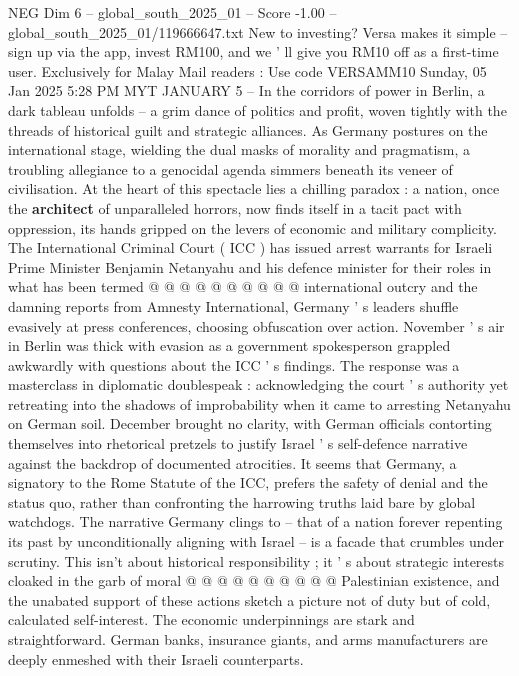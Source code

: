 \begin{textsample}{NEG Dim 6 – global\_south\_2025\_01 – Score -1.00 – global\_south\_2025\_01/119666647.txt}  \label{ex:f6_neg_086}
New to investing?
Versa makes it simple -- sign up via the app, invest RM100, and we ' ll give you RM10 off as a first-time user.
Exclusively for Malay Mail readers : Use code VERSAMM10 Sunday, 05 Jan 2025 5:28 PM MYT JANUARY 5 -- In the corridors of power in Berlin, a dark tableau unfolds -- a grim dance of politics and profit, woven tightly with the threads of historical guilt and strategic alliances.
As Germany postures on the international stage, wielding the dual masks of morality and pragmatism, a troubling allegiance to a genocidal agenda simmers beneath its veneer of civilisation.
At the heart of this spectacle lies a chilling paradox : a nation, once the \textbf{architect} of unparalleled horrors, now finds itself in a tacit pact with oppression, its hands gripped on the levers of economic and military complicity.
The International Criminal Court ( ICC ) has issued arrest warrants for Israeli Prime Minister Benjamin Netanyahu and his defence minister for their roles in what has been termed @ @ @ @ @ @ @ @ @ @ international outcry and the damning reports from Amnesty International, Germany ' s leaders shuffle evasively at press conferences, choosing obfuscation over action.
November ' s air in Berlin was thick with evasion as a government spokesperson grappled awkwardly with questions about the ICC ' s findings.
The response was a masterclass in diplomatic doublespeak : acknowledging the court ' s authority yet retreating into the shadows of improbability when it came to arresting Netanyahu on German soil.
December brought no clarity, with German officials contorting themselves into rhetorical pretzels to justify Israel ' s self-defence narrative against the backdrop of documented atrocities.
It seems that Germany, a signatory to the Rome Statute of the ICC, prefers the safety of denial and the status quo, rather than confronting the harrowing truths laid bare by global watchdogs.
The narrative Germany clings to -- that of a nation forever repenting its past by unconditionally aligning with Israel -- is a facade that crumbles under scrutiny.
This isn't about historical responsibility ; it ' s about strategic interests cloaked in the garb of moral @ @ @ @ @ @ @ @ @ @ Palestinian existence, and the unabated support of these actions sketch a picture not of duty but of cold, calculated self-interest.
The economic underpinnings are stark and straightforward.
German banks, insurance giants, and arms manufacturers are deeply enmeshed with their Israeli counterparts.

\end{textsample}
